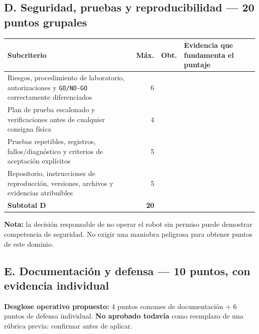 \documentclass[10pt, a4paper]{article}
\begin{document}
\subsection*{D. Seguridad, pruebas y reproducibilidad — 20 puntos grupales}
\begingroup
\scriptsize
\setlength{\tabcolsep}{3.5pt}
\renewcommand{\arraystretch}{1.40}
\noindent\begin{tabularx}{\textwidth}{|>{\hsize=1.15\hsize\raggedright\arraybackslash}X|r|r|>{\hsize=0.85\hsize\raggedright\arraybackslash}X|}
\hline
\rowcolor{ucbblue!15}
\textbf{Subcriterio} & \textbf{Máx.} & \textbf{Obt.} & \textbf{Evidencia que fundamenta el puntaje} \\ \hline
Riesgos, procedimiento de laboratorio, autorizaciones y \texttt{GO/NO-GO} correctamente diferenciados & 6 & & \\ \hline
Plan de prueba escalonado y verificaciones antes de cualquier consigna física & 4 & & \\ \hline
Pruebas repetibles, registros, fallos/diagnóstico y criterios de aceptación explícitos & 5 & & \\ \hline
Repositorio, instrucciones de reproducción, versiones, archivos y evidencias atribuibles & 5 & & \\ \hline
\rowcolor{offcolor}
\textbf{Subtotal D} & \textbf{20} & & \\ \hline
\end{tabularx}
\endgroup

{\footnotesize\textbf{Nota:} la decisión responsable de no operar el robot sin permiso puede demostrar competencia de seguridad. No exigir una maniobra peligrosa para obtener puntos de este dominio.}

\subsection*{E. Documentación y defensa — 10 puntos, con evidencia individual}
{\footnotesize\textbf{Desglose operativo propuesto:} 4 puntos comunes de documentación + 6 puntos de defensa individual. \textbf{No aprobado todavía} como reemplazo de una rúbrica previa: confirmar antes de aplicar.}
\end{document}
